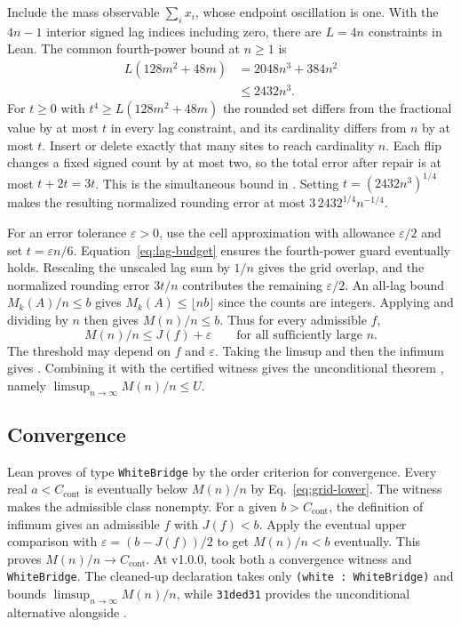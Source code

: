 \documentclass[sigplan,10pt,anonymous,review,balance=false]{acmart}
\newcommand{\ct}{C_{\mathrm{cont}}}
\newcommand{\leanid}[1]{\texttt{#1}}
\begin{document}
Include the mass observable $\sum_i x_i$, whose endpoint
oscillation is one. With the $4n-1$ interior signed lag
indices including zero, there are $L=4n$ constraints in Lean.
The common fourth-power bound at $n\ge1$ is
\begin{equation}
 \begin{aligned}
 L(128m^2+48m)
   &=2048n^3+384n^2\\
   &\le2432n^3 .
 \end{aligned}
 \label{eq:lag-budget}
\end{equation}
For $t\ge0$ with $t^4\ge L(128m^2+48m)$ the rounded set differs
from the fractional value by at most $t$ in every lag
constraint, and its cardinality differs from $n$ by at most
$t$. Insert or delete exactly that many sites to reach
cardinality $n$. Each flip changes a fixed signed count by
at most two, so the total error after repair is at most
$t+2t=3t$. This is the simultaneous bound in
. Setting $t=(2432n^3)^{1/4}$
makes the resulting normalized rounding error at most
$3\,2432^{1/4}n^{-1/4}$.

For an error tolerance $\varepsilon>0$, use the cell
approximation with allowance $\varepsilon/2$ and set
$t=\varepsilon n/6$. Equation~\eqref{eq:lag-budget} ensures
the fourth-power guard eventually holds. Rescaling the
unscaled lag sum by $1/n$ gives the grid overlap, and the
normalized rounding error $3t/n$ contributes the remaining
$\varepsilon/2$. An all-lag bound $M_k(A)/n\le b$ gives
$M_k(A)\le\lfloor nb\rfloor$ since the counts are integers.
Applying  and dividing by $n$
then gives $M(n)/n\le b$. Thus for every admissible $f$,
\[
 M(n)/n\le J(f)+\varepsilon
 \qquad\text{for all sufficiently large }n.
\]
The threshold may depend on $f$ and $\varepsilon$. Taking the
limsup and then the infimum gives
. Combining it with the
certified witness gives the unconditional theorem
, namely $\limsup_{n\to\infty} M(n)/n\le U$.

\subsection{Convergence}
\label{sec:convergence}

Lean proves  of type
\leanid{WhiteBridge} by the order criterion for convergence.
Every real $a<\ct$ is eventually below $M(n)/n$ by
Eq.~\eqref{eq:grid-lower}. The witness makes the admissible
class nonempty. For a given $b>\ct$, the definition of
infimum gives an admissible $f$ with $J(f)<b$. Apply the
eventual upper comparison with $\varepsilon=(b-J(f))/2$
to get $M(n)/n<b$ eventually. This proves $M(n)/n\to\ct$.
At v1.0.0,  took both a convergence
witness and \leanid{WhiteBridge}. The cleaned-up declaration takes only
\leanid{(white : WhiteBridge)} and bounds $\limsup_{n\to\infty} M(n)/n$,
while \texttt{31ded31} provides the unconditional alternative
 alongside .
\end{document}
